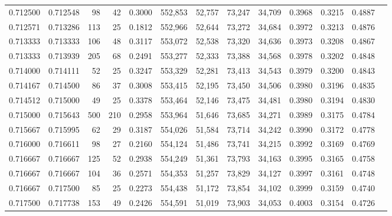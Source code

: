 \begin{tabular}{rrrrrrrrrrrrr}
0.712500 & 0.712548 &    98 &  42 &                                     0.3000 & 552,853 &  52,757 &  73,247 &  34,709 & 0.3968 & 0.3215 & 0.4887 \\
0.712571 & 0.713286 &   113 &  25 &                                     0.1812 & 552,966 &  52,644 &  73,272 &  34,684 & 0.3972 & 0.3213 & 0.4876 \\
0.713333 & 0.713333 &   106 &  48 &                                     0.3117 & 553,072 &  52,538 &  73,320 &  34,636 & 0.3973 & 0.3208 & 0.4867 \\
0.713333 & 0.713939 &   205 &  68 &                                     0.2491 & 553,277 &  52,333 &  73,388 &  34,568 & 0.3978 & 0.3202 & 0.4848 \\
0.714000 & 0.714111 &    52 &  25 &                                     0.3247 & 553,329 &  52,281 &  73,413 &  34,543 & 0.3979 & 0.3200 & 0.4843 \\
0.714167 & 0.714500 &    86 &  37 &                                     0.3008 & 553,415 &  52,195 &  73,450 &  34,506 & 0.3980 & 0.3196 & 0.4835 \\
0.714512 & 0.715000 &    49 &  25 &                                     0.3378 & 553,464 &  52,146 &  73,475 &  34,481 & 0.3980 & 0.3194 & 0.4830 \\
0.715000 & 0.715643 &   500 & 210 &                                     0.2958 & 553,964 &  51,646 &  73,685 &  34,271 & 0.3989 & 0.3175 & 0.4784 \\
0.715667 & 0.715995 &    62 &  29 &                                     0.3187 & 554,026 &  51,584 &  73,714 &  34,242 & 0.3990 & 0.3172 & 0.4778 \\
0.716000 & 0.716611 &    98 &  27 &                                     0.2160 & 554,124 &  51,486 &  73,741 &  34,215 & 0.3992 & 0.3169 & 0.4769 \\
0.716667 & 0.716667 &   125 &  52 &                                     0.2938 & 554,249 &  51,361 &  73,793 &  34,163 & 0.3995 & 0.3165 & 0.4758 \\
0.716667 & 0.716667 &   104 &  36 &                                     0.2571 & 554,353 &  51,257 &  73,829 &  34,127 & 0.3997 & 0.3161 & 0.4748 \\
0.716667 & 0.717500 &    85 &  25 &                                     0.2273 & 554,438 &  51,172 &  73,854 &  34,102 & 0.3999 & 0.3159 & 0.4740 \\
0.717500 & 0.717738 &   153 &  49 &                                     0.2426 & 554,591 &  51,019 &  73,903 &  34,053 & 0.4003 & 0.3154 & 0.4726 \\

\end{tabular}
